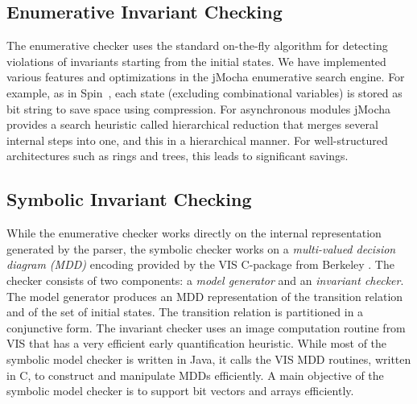 \documentclass[10pt,twocolumn]{article}
\newcommand{\Mocha}{\mbox{\sc Mocha}}
\def\jmocha{{\small\sc jMocha}}
\begin{document}
\subsection{Enumerative Invariant Checking}
\label{sec:Enumerative Invariant Checking}

The enumerative checker uses the standard on-the-fly algorithm
for detecting violations of invariants starting from the initial states.
We have implemented various features and optimizations in the \jmocha{}
enumerative search engine. 
For example, as in {\sc Spin}~\cite{spin}, each state (excluding combinational variables) 
is stored as bit string to save space using compression.
For asynchronous modules
\jmocha{} provides a 
search heuristic called hierarchical reduction \cite{AGW00} that
merges several internal steps into one, and this
in a hierarchical manner. For well-structured architectures
such as rings and trees, this leads to significant savings.

\vspace*{-1mm}
\subsection{Symbolic Invariant Checking}
\label{sec:Symbolic Invariant Checking}

While the enumerative checker works directly on the internal representation
generated by the parser, the symbolic checker works on a \emph{multi-valued 
decision diagram (MDD)} encoding 
provided by the VIS C-package from Berkeley \cite{VIS96}.  
The checker consists of
two components: a \emph{model generator} and an \emph{invariant checker}.  The
model generator produces an MDD representation of the transition relation and
of the set of initial states. The transition relation is partitioned
in a conjunctive form. The invariant checker uses an
image computation routine from VIS that has a very
efficient early quantification heuristic. 
While most of the symbolic model checker is written in Java, it calls the 
VIS MDD routines, written in C, to construct and manipulate MDDs efficiently.
A main objective of the symbolic model checker is to support
bit vectors and arrays efficiently.

%
\end{document}
